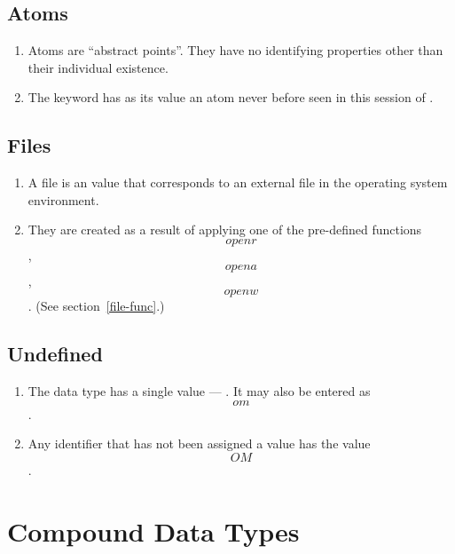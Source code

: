    \subsection{Atoms}
    \begin{enumerate}
    \item
    Atoms are ``abstract points''.
    They have no identifying properties other than their individual existence.

    \item
    The keyword  has as its value an atom never before
    seen in this session of \ISETL{}\@.
    \end{enumerate}
    
    \subsection{Files}
    \begin{enumerate}
    \item{}
    A file is an \ISETL{} value that
    corresponds to an external file in the operating system environment.

    \item
    They are created as a result of applying one of the pre-defined
    functions \[openr\], \[opena\], \[openw\].
    (See section~\ref{file-func}.)
    \end{enumerate}

    \subsection{Undefined}
    \begin{enumerate}
    \item
    The data type 
    has a single value --- \@.
    It may also be entered as \[om\].

    \item
    Any identifier that has not been
    assigned a value has the value \[OM\]\@.
    \end{enumerate}



\section{Compound Data Types}

